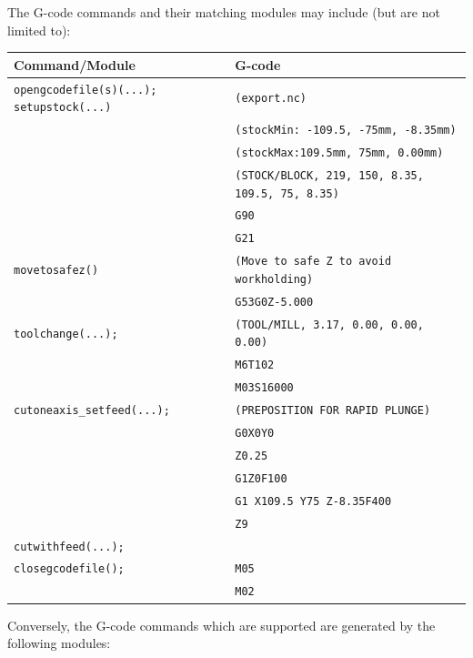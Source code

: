 \documentclass{ltxdoc}
\begin{document}
The G-code commands and their matching modules may include (but are not limited to):

\bigskip

\noindent \begin{tabular}{@{}ll@{}} \toprule
 Command/Module                    & G-code                                        \\ \midrule
 \texttt{opengcodefile(s)(...);}
 \texttt{setupstock(...)}          & \texttt{(export.nc)}                          \\
                                   & \texttt{(stockMin: -109.5, -75mm, -8.35mm)}\\
                                   & \texttt{(stockMax:109.5mm, 75mm, 0.00mm)}\\
                                   & \texttt{(STOCK/BLOCK, 219, 150, 8.35, 109.5, 75, 8.35)}\\
                                   & \texttt{G90}\\
                                   & \texttt{G21} \\ \midrule
 \texttt{movetosafez()}            & \texttt{(Move to safe Z to avoid workholding)}\\
                                   & \texttt{G53G0Z-5.000}\\ \midrule
 \texttt{toolchange(...);}         & \texttt{(TOOL/MILL, 3.17, 0.00, 0.00, 0.00)} \\
                                   & \texttt{M6T102} \\
                                   & \texttt{M03S16000} \\ \midrule
 \verb|cutoneaxis_setfeed(...);|   & \texttt{(PREPOSITION FOR RAPID PLUNGE)}\\
  & \texttt{G0X0Y0} \\
  & \texttt{Z0.25} \\
  & \texttt{G1Z0F100} \\
  & \texttt{G1 X109.5 Y75 Z-8.35F400} \\
  & \texttt{Z9}\\
 \texttt{cutwithfeed(...);}\\ \midrule

 \texttt{closegcodefile();}        & \texttt{M05}\\
                                   & \texttt{M02}\\ 
\bottomrule
\end{tabular}
\bigskip

\noindent Conversely, the G-code commands which are supported are generated by the following modules:
\end{document}
